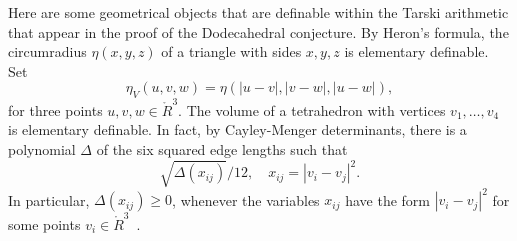 \documentclass{article} %
\newtheorem{definition}[lemma]{Definition}
\begin{document}
Here are some geometrical 
objects that are definable within the Tarski arithmetic
that appear in the proof of the Dodecahedral conjecture.
By Heron's formula, the circumradius $\eta(x,y,z)$ of a triangle with sides $x,y,z$ is elementary definable.
Set 
$$\eta_V(u,v,w) = \eta(|u-v|,|v-w|,|u-w|),$$ 
for three points
$u,v,w\in\ring{R}^3$.
%
The volume  of a tetrahedron with vertices $v_1,\ldots,v_4$ is elementary definable.  In fact, by Cayley-Menger determinants, there is a polynomial
$\Delta$ of the six squared edge lengths such that
   $$
   \sqrt{\Delta(x_{ij})}/12,\quad x_{ij}=|v_i-v_j|^2.
   $$
In particular, $\Delta(x_{ij})\ge0$, whenever the variables $x_{ij}$ have
the form $|v_i-v_j|^2$ for some points $v_i\in\ring{R}^3$~\cite[Lemma~8.1.4]{Hales:1997:DCG}.
\end{document}
